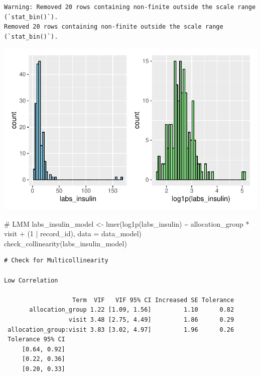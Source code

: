 \documentclass[
  letterpaper,
  DIV=11,
  numbers=noendperiod]{scrartcl}
\newenvironment{Shaded}{\begin{snugshade}}{\end{snugshade}}
\newcommand{\AttributeTok}[1]{\textcolor[rgb]{0.40,0.45,0.13}{#1}}
\newcommand{\CommentTok}[1]{\textcolor[rgb]{0.37,0.37,0.37}{#1}}
\newcommand{\DecValTok}[1]{\textcolor[rgb]{0.68,0.00,0.00}{#1}}
\newcommand{\FunctionTok}[1]{\textcolor[rgb]{0.28,0.35,0.67}{#1}}
\newcommand{\NormalTok}[1]{\textcolor[rgb]{0.00,0.23,0.31}{#1}}
\newcommand{\OtherTok}[1]{\textcolor[rgb]{0.00,0.23,0.31}{#1}}
\newcommand{\SpecialCharTok}[1]{\textcolor[rgb]{0.37,0.37,0.37}{#1}}
\begin{document}
\begin{verbatim}
Warning: Removed 20 rows containing non-finite outside the scale range (`stat_bin()`).
Removed 20 rows containing non-finite outside the scale range (`stat_bin()`).
\end{verbatim}

\includegraphics{Outcomes_V1V2V3_files/figure-pdf/labs_insulin_1-1.pdf}

\begin{Shaded}
\begin{Highlighting}[]
\CommentTok{\# LMM}
\NormalTok{labs\_insulin\_model }\OtherTok{\textless{}{-}} \FunctionTok{lmer}\NormalTok{(}\FunctionTok{log1p}\NormalTok{(labs\_insulin) }\SpecialCharTok{\textasciitilde{}}\NormalTok{ allocation\_group }\SpecialCharTok{*}\NormalTok{ visit }\SpecialCharTok{+}\NormalTok{ (}\DecValTok{1} \SpecialCharTok{|}\NormalTok{ record\_id), }\AttributeTok{data =}\NormalTok{ data\_model)}
\FunctionTok{check\_collinearity}\NormalTok{(labs\_insulin\_model)}
\end{Highlighting}
\end{Shaded}

\begin{verbatim}
# Check for Multicollinearity

Low Correlation

                   Term  VIF   VIF 95% CI Increased SE Tolerance
       allocation_group 1.22 [1.09, 1.56]         1.10      0.82
                  visit 3.48 [2.75, 4.49]         1.86      0.29
 allocation_group:visit 3.83 [3.02, 4.97]         1.96      0.26
 Tolerance 95% CI
     [0.64, 0.92]
     [0.22, 0.36]
     [0.20, 0.33]
\end{verbatim}
\end{document}

